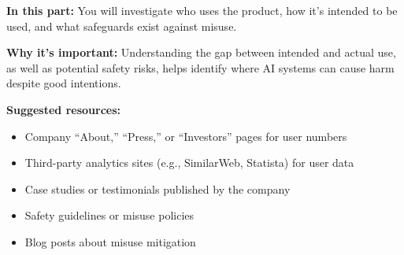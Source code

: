 \documentclass{article}
\theoremstyle{case}
\theoremstyle{definition}
\begin{document}
\textbf{In this part:} You will investigate who uses the product, how it's intended to be used, and what safeguards exist against misuse.

\vspace{2mm}

\textbf{Why it's important:} Understanding the gap between intended and actual use, as well as potential safety risks, helps identify where AI systems can cause harm despite good intentions.

\vspace{2mm}

\textbf{Suggested resources:}
\begin{itemize}
  \item Company ``About,'' ``Press,'' or ``Investors'' pages for user numbers
  \item Third-party analytics sites (e.g., SimilarWeb, Statista) for user data
  \item Case studies or testimonials published by the company
  \item Safety guidelines or misuse policies
  \item Blog posts about misuse mitigation
\end{itemize}
\end{document}
